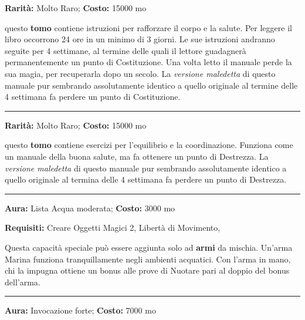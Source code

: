 \begin{multicols}{2}
\textbf{Rarità:} Molto Raro; \textbf{Costo:} 15000 mo

questo \textbf{tomo} contiene istruzioni per rafforzare il corpo e la salute. Per leggere il libro occorrono 24 ore in un minimo di 3 giorni. Le sue istruzioni andranno seguite per 4 settimane, al termine delle quali il lettore guadagnerà permanentemente un punto di Costituzione. Una volta letto il manuale perde la sua magia, per recuperarla dopo un secolo. La \emph{versione maledetta} di questo manuale pur sembrando assolutamente identico a quello originale al termine delle 4 settimana fa perdere un punto di Costituzione.

\smallskip\noindent\rule{\linewidth}{2pt}  \hypertarget{ManualedellaVelocitàdiazione}{}\medskip{}\noindent\label{ManualedellaVelocitàdiazione}

\textbf{Rarità:} Molto Raro; \textbf{Costo:} 15000 mo

questo \textbf{tomo} contiene esercizi per l'equilibrio e la coordinazione. Funziona come un manuale della buona salute, ma fa ottenere un punto di Destrezza. La \emph{versione maledetta} di questo manuale pur sembrando assolutamente identico a quello originale al termina delle 4 settimana fa perdere un punto di Destrezza.

\smallskip\noindent\rule{\linewidth}{2pt}  \hypertarget{Marina}{}\medskip{}\noindent\label{Marina}

\textbf{Aura:} Lista Acqua moderata; \textbf{Costo:} 3000 mo

\textbf{Requisiti:} Creare Oggetti Magici 2, Libertà di Movimento,

Questa capacità speciale può essere aggiunta solo ad \textbf{armi} da mischia. Un'arma Marina funziona tranquillamente negli ambienti acquatici. Con l'arma in mano, chi la impugna ottiene un bonus alle prove di Nuotare pari al doppio del bonus dell'arma.

\smallskip\noindent\rule{\linewidth}{2pt}  \hypertarget{MazzadellaPunizione}{}\medskip{}\noindent\label{MazzadellaPunizione}

\textbf{Aura:} Invocazione forte; \textbf{Costo:} 7000 mo


\end{multicols}

